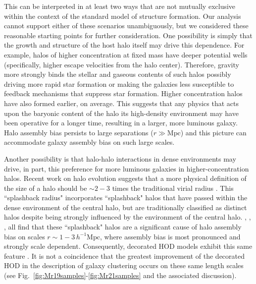 \documentclass[usenatbib,usegraphicx,letterpaper]{mn2e}
\begin{document}
This can be interpreted in at least two ways that are not mutually exclusive within the context of the standard 
model of structure formation. Our analysis cannot support either of these scenarios unambiguously, 
but we considered these reasonable starting points for further consideration. 
One possibility is simply that the growth and structure of the host 
halo itself may drive this dependence. For example, halos of higher concentration at fixed 
mass have deeper potential wells (specifically, higher escape velocities from the halo center). 
Therefore, gravity more strongly binds the stellar and gaseous contents of such halos possibly 
driving more rapid star formation or making the galaxies less susceptible to feedback mechanisms 
that suppress star formation. Higher concentration halos have also formed earlier, on average. This 
suggests that any physics that acts upon the baryonic content of the halo its high-density 
environment may have been operative for a longer time, resulting in a larger, more luminous galaxy. 
Halo assembly bias persists to large separations ($r \gg \mathrm{Mpc}$) and this picture can 
accommodate galaxy assembly bias on such large scales.

Another possibility is that halo-halo interactions in dense environments may drive, in part, 
this preference for more luminous galaxies in higher-concentration halos. Recent work 
on halo evolution suggests that a more physical definition of the size of a halo should be 
$\sim 2-3$ times the traditional virial radius 
\citep{wetzel_etal14,adhikari_etal14,wetzel_nagai15,sunayama_etal16,more_etal16}. 
This ``splashback radius" incorporates ``splashback" halos that have passed within the dense environment 
of the central halo, but are traditionally classified as distinct halos despite being strongly 
influenced by the environment of the central halo. \citet{wang_etal07}, \citet{wetzel_etal14},  
\citet{sunayama_etal16}, all find that these ``splashback" halos are a significant cause 
of halo assembly bias on scales $r \sim 1-3\, h^{-1}\mathrm{Mpc}$, where assembly bias is 
most pronounced and strongly scale dependent. Consequently, decorated HOD models 
exhibit this same feature \citet{hearin_etal16}. It is not a coincidence that the greatest 
improvement of the decorated HOD in the description of galaxy clustering occurs on these same 
length scales (see Fig.~\ref{fig:Mr19samples}-\ref{fig:Mr21samples} and the associated discussion). 
\end{document}
